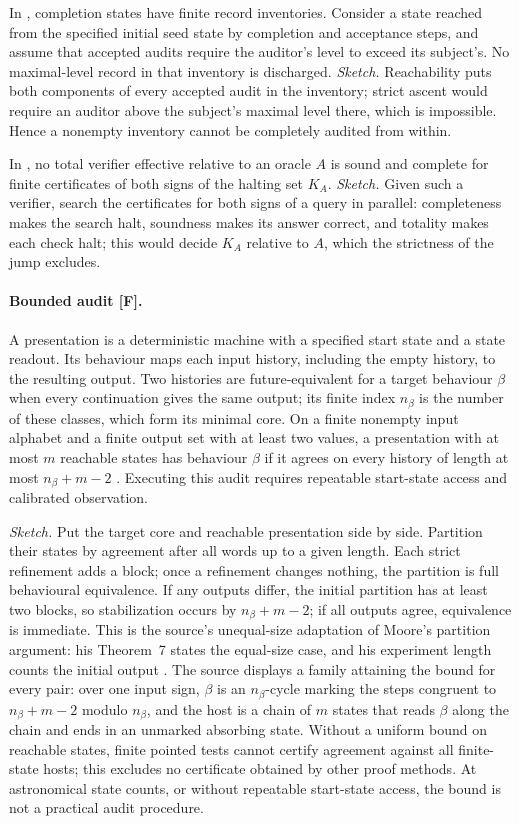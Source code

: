 \documentclass[pdflatex,sn-basic]{sn-jnl}%
\begin{document}
\begin{appendices}
In \citet{tsiokos2026v11}, completion states have finite record inventories. Consider a state reached from the specified initial seed state by completion and acceptance steps, and assume that accepted audits require the auditor's level to exceed its subject's. No maximal-level record in that inventory is discharged. \emph{Sketch.} Reachability puts both components of every accepted audit in the inventory; strict ascent would require an auditor above the subject's maximal level there, which is impossible. Hence a nonempty inventory cannot be completely audited from within.

In \citet{tsiokos2026v5}, no total verifier effective relative to an oracle $A$ is sound and complete for finite certificates of both signs of the halting set $K_A$. \emph{Sketch.} Given such a verifier, search the certificates for both signs of a query in parallel: completeness makes the search halt, soundness makes its answer correct, and totality makes each check halt; this would decide $K_A$ relative to $A$, which the strictness of the jump excludes.

\paragraph{Bounded audit [F].} A presentation is a deterministic machine with a specified start state and a state readout. Its behaviour maps each input history, including the empty history, to the resulting output. Two histories are future-equivalent for a target behaviour $\beta$ when every continuation gives the same output; its finite index $n_\beta$ is the number of these classes, which form its minimal core. On a finite nonempty input alphabet and a finite output set with at least two values, a presentation with at most $m$ reachable states has behaviour $\beta$ if it agrees on every history of length at most $n_\beta+m-2$ \citep{tsiokos2026v15}. Executing this audit requires repeatable start-state access and calibrated observation.

\emph{Sketch.} Put the target core and reachable presentation side by side. Partition their states by agreement after all words up to a given length. Each strict refinement adds a block; once a refinement changes nothing, the partition is full behavioural equivalence. If any outputs differ, the initial partition has at least two blocks, so stabilization occurs by $n_\beta+m-2$; if all outputs agree, equivalence is immediate. This is the source's unequal-size adaptation of Moore's partition argument: his Theorem~7 states the equal-size case, and his experiment length counts the initial output \citep{moore1956}. The source displays a family attaining the bound for every pair: over one input sign, $\beta$ is an $n_\beta$-cycle marking the steps congruent to $n_\beta+m-2$ modulo $n_\beta$, and the host is a chain of $m$ states that reads $\beta$ along the chain and ends in an unmarked absorbing state. Without a uniform bound on reachable states, finite pointed tests cannot certify agreement against all finite-state hosts; this excludes no certificate obtained by other proof methods. At astronomical state counts, or without repeatable start-state access, the bound is not a practical audit procedure.

\end{appendices}
\end{document}
